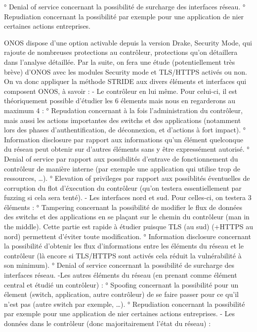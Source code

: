 ° Denial of service concernant la possibilité de surcharge des interfaces réseau.
° Repudiation concernant la possibilité par exemple pour une application de nier certaines actions entreprises.

ONOS dispose d’une option activable depuis la version Drake, Security Mode, qui rajoute de nombreuses protections au contrôleur, protections qu’on détaillera dans l’analyse détaillée. Par la suite, on fera une étude (potentiellement très brève) d’ONOS avec les modules Security mode et TLS/HTTPS activés ou non.
On va donc appliquer la méthode STRIDE aux divers éléments et interfaces qui composent ONOS, à savoir :
- Le contrôleur en lui même. Pour celui-ci, il est théoriquement possible d’étudier les 6 élements mais nous en regarderons au maximum 4 :
° Repudation concernant à la fois l’administration du contrôleur, mais aussi les actions importantes des switchs et des applications (notamment lors des phases d’authentification, de déconnexion, et d’actions à fort impact).
° Information disclosure par rapport aux informations qu’un élément quelconque du réseau peut obtenir sur d’autres éléments sans y être expressément autorisé.
° Denial of service par rapport aux possibilités d’entrave de fonctionnement du contrôleur de manière interne (par exemple une application qui utilise trop de ressources, …).
° Elevation of privileges par rapport aux possiblités éventuelles de corruption du flot d’éxecution du contrôleur (qu’on testera essentiellement par fuzzing si cela sera tenté).
- Les interfaces nord et sud. Pour celles-ci, on testera 3 éléments :
° Tampering concernant la possibilité de modifier le flux de données des switchs et des applications en se plaçant sur le chemin du contrôleur (man in the middle). Cette partie est rapide à étudier puisque TLS (au sud) (+HTTPS au nord) permettent d’éviter toute modification.
° Information disclosure concernant la possibilité d’obtenir les flux d’informations entre les éléments du réseau et le contrôleur (là encore si TLS/HTTPS sont activés cela réduit la vulnérabilité à son minimum).
° Denial of service concernant la possibilité de surcharge des interfaces réseau.
-Les autres éléments du réseau (en prenant comme élément central et étudié un contrôleur) :
° Spoofing concernant la possibilité pour un élement (switch, application, autre contrôleur) de se faire passer pour ce qu’il n’est pas (autre switch par exemple, …).
° Repudiation concernant la possibilité par exemple pour une application de nier certaines actions entreprises.
- Les données dans le contrôleur (donc majoritairement l’état du réseau) :
